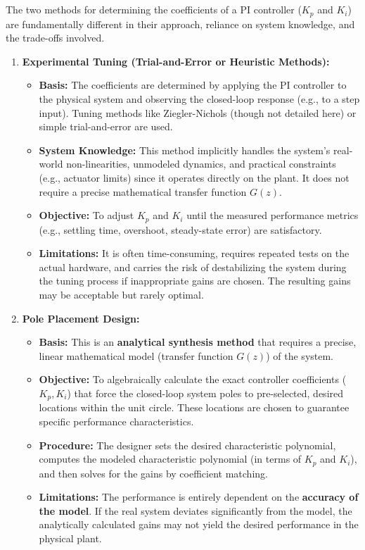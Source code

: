 \documentclass[a4paper,12pt]{article}
\begin{document}
\section{}

The two methods for determining the coefficients of a PI controller ($K_p$ and $K_i$) are fundamentally different in their approach, reliance on system knowledge, and the trade-offs involved.

\begin{enumerate}
    \item \textbf{Experimental Tuning (Trial-and-Error or Heuristic Methods):}
    \begin{itemize}
        \item \textbf{Basis:} The coefficients are determined by applying the PI controller to the physical system and observing the closed-loop response (e.g., to a step input). Tuning methods like Ziegler-Nichols (though not detailed here) or simple trial-and-error are used.
        \item \textbf{System Knowledge:} This method implicitly handles the system's real-world non-linearities, unmodeled dynamics, and practical constraints (e.g., actuator limits) since it operates directly on the plant. It does not require a precise mathematical transfer function $G(z)$.
        \item \textbf{Objective:} To adjust $K_p$ and $K_i$ until the measured performance metrics (e.g., settling time, overshoot, steady-state error) are satisfactory.
        \item \textbf{Limitations:} It is often time-consuming, requires repeated tests on the actual hardware, and carries the risk of destabilizing the system during the tuning process if inappropriate gains are chosen. The resulting gains may be acceptable but rarely optimal.
    \end{itemize}

    \item \textbf{Pole Placement Design:}
    \begin{itemize}
        \item \textbf{Basis:} This is an \textbf{analytical synthesis method} that requires a precise, linear mathematical model (transfer function $G(z)$) of the system.
        \item \textbf{Objective:} To algebraically calculate the exact controller coefficients ($K_p, K_i$) that force the closed-loop system poles to pre-selected, desired locations within the unit circle. These locations are chosen to guarantee specific performance characteristics.
        \item \textbf{Procedure:} The designer sets the desired characteristic polynomial, computes the modeled characteristic polynomial (in terms of $K_p$ and $K_i$), and then solves for the gains by coefficient matching.
        \item \textbf{Limitations:} The performance is entirely dependent on the \textbf{accuracy of the model}. If the real system deviates significantly from the model, the analytically calculated gains may not yield the desired performance in the physical plant.
    \end{itemize}
\end{enumerate}
\end{document}
